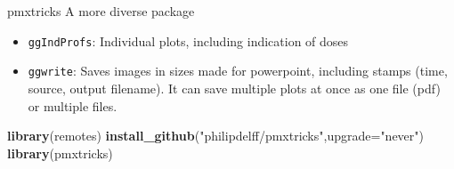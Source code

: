 \documentclass[
  8pt,
  ignorenonframetext,
  aspectratio=169]{beamer}
\newenvironment{Shaded}{\begin{snugshade}}{\end{snugshade}}
\newcommand{\DataTypeTok}[1]{\textcolor[rgb]{0.13,0.29,0.53}{#1}}
\newcommand{\KeywordTok}[1]{\textcolor[rgb]{0.13,0.29,0.53}{\textbf{#1}}}
\newcommand{\NormalTok}[1]{#1}
\newcommand{\StringTok}[1]{\textcolor[rgb]{0.31,0.60,0.02}{#1}}
\providecommand{\tightlist}{%
  \setlength{\itemsep}{0pt}\setlength{\parskip}{0pt}}
\begin{document}
\begin{frame}[fragile]{pmxtricks}
\protect\hypertarget{pmxtricks}{}
A more diverse package

\begin{itemize}
\tightlist
\item
  \texttt{ggIndProfs}: Individual plots, including indication of doses
\item
  \texttt{ggwrite}: Saves images in sizes made for powerpoint, including
  stamps (time, source, output filename). It can save multiple plots at
  once as one file (pdf) or multiple files.
\end{itemize}

\begin{Shaded}
\begin{Highlighting}[]
\KeywordTok{library}\NormalTok{(remotes)}
\KeywordTok{install\_github}\NormalTok{(}\StringTok{"philipdelff/pmxtricks"}\NormalTok{,}\DataTypeTok{upgrade=}\StringTok{"never"}\NormalTok{)}
\KeywordTok{library}\NormalTok{(pmxtricks)}
\end{Highlighting}
\end{Shaded}
\end{frame}
\end{document}
